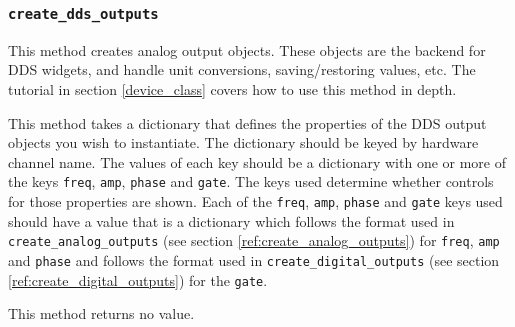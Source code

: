 \documentclass[12pt]{article}
\begin{document}
\subsubsection{\texttt{create\_dds\_outputs}}\label{ref:create_dds_outputs}
This method creates analog output objects. 
These objects are the backend for DDS widgets, and handle unit conversions, saving/restoring values, etc.
The tutorial in section \ref{device_class} covers how to use this method in depth.

This method takes a dictionary that defines the properties of the DDS output objects you wish to instantiate. 
The dictionary should be keyed by hardware channel name.
The values of each key should be a dictionary with one or more of the keys \texttt{freq}, \texttt{amp}, \texttt{phase} and \texttt{gate}.
The keys used determine whether controls for those properties are shown.
Each of the \texttt{freq}, \texttt{amp}, \texttt{phase} and \texttt{gate} keys used should have a value that is a dictionary which follows the format used in \texttt{create\_analog\_outputs} (see section \ref{ref:create_analog_outputs}) for \texttt{freq}, \texttt{amp} and \texttt{phase} and follows the format used in \texttt{create\_digital\_outputs} (see section \ref{ref:create_digital_outputs}) for the \texttt{gate}.

This method returns no value.
\end{document}
